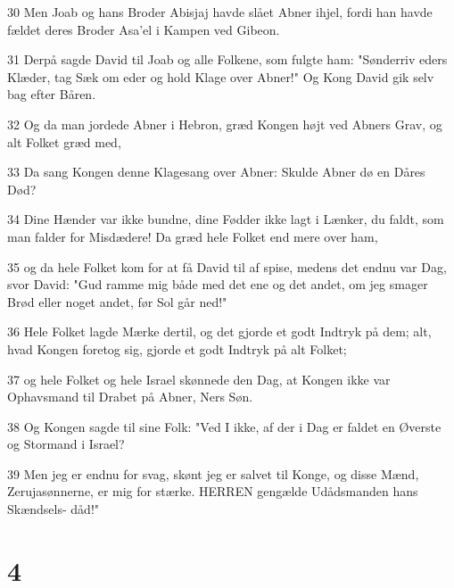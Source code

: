 \par 30 Men Joab og hans Broder Abisjaj havde slået Abner ihjel, fordi han havde fældet deres Broder Asa'el i Kampen ved Gibeon.
\par 31 Derpå sagde David til Joab og alle Folkene, som fulgte ham: "Sønderriv eders Klæder, tag Sæk om eder og hold Klage over Abner!" Og Kong David gik selv bag efter Båren.
\par 32 Og da man jordede Abner i Hebron, græd Kongen højt ved Abners Grav, og alt Folket græd med,
\par 33 Da sang Kongen denne Klagesang over Abner: Skulde Abner dø en Dåres Død?
\par 34 Dine Hænder var ikke bundne, dine Fødder ikke lagt i Lænker, du faldt, som man falder for Misdædere! Da græd hele Folket end mere over ham,
\par 35 og da hele Folket kom for at få David til af spise, medens det endnu var Dag, svor David: "Gud ramme mig både med det ene og det andet, om jeg smager Brød eller noget andet, før Sol går ned!"
\par 36 Hele Folket lagde Mærke dertil, og det gjorde et godt Indtryk på dem; alt, hvad Kongen foretog sig, gjorde et godt Indtryk på alt Folket;
\par 37 og hele Folket og hele Israel skønnede den Dag, at Kongen ikke var Ophavsmand til Drabet på Abner, Ners Søn.
\par 38 Og Kongen sagde til sine Folk: "Ved I ikke, af der i Dag er faldet en Øverste og Stormand i Israel?
\par 39 Men jeg er endnu for svag, skønt jeg er salvet til Konge, og disse Mænd, Zerujasønnerne, er mig for stærke. HERREN gengælde Udådsmanden hans Skændsels- dåd!"

\chapter{4}

